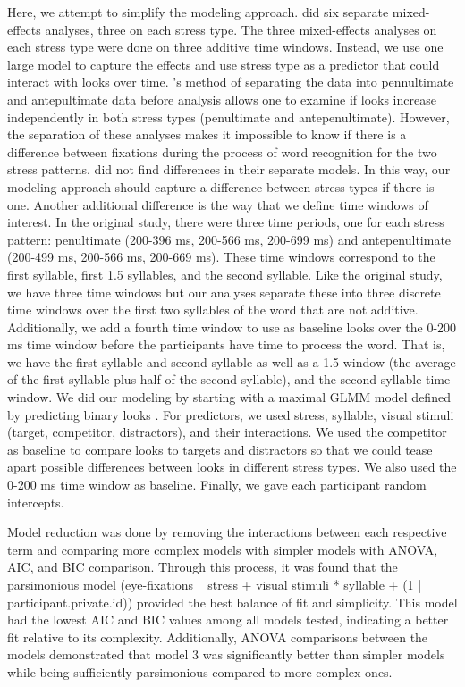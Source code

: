 Here, we attempt to simplify the modeling approach. \cite{Sulpizio_McQueen_2012} did six separate mixed-effects analyses, three on each stress type. The three mixed-effects analyses on each stress type were done on three additive time windows. Instead, we use one large model to capture the effects and use stress type as a predictor that could interact with looks over time. \cite{Sulpizio_McQueen_2012}'s method of separating the data into pennultimate and antepultimate data before analysis allows one to examine if looks increase independently in both stress types (penultimate and antepenultimate). However, the separation of these analyses makes it impossible to know if there is a difference between fixations during the process of word recognition for the two stress patterns. \cite{Sulpizio_McQueen_2012} did not find differences in their separate models. In this way, our modeling approach should capture a difference between stress types if there is one. Another additional difference is the way that we define time windows of interest. In the original study, there were three time periods, one for each stress pattern: penultimate (200-396 ms, 200-566 ms, 200-699 ms) and antepenultimate (200-499 ms, 200-566 ms, 200-669 ms). These time windows correspond to the first syllable, first 1.5 syllables, and the second syllable. Like the original study, we have three time windows but our analyses separate these into three discrete time windows over the first two syllables of the word that are not additive. Additionally, we add a fourth time window to use as baseline looks over the 0-200 ms time window before the participants have time to process the word. That is, we have the first syllable and second syllable as well as a 1.5 window (the average of the first syllable plus half of the second syllable), and the second syllable time window. We did our modeling by starting with a maximal GLMM model defined by predicting binary looks \citep{Barr_2008}. For predictors, we used stress, syllable, visual stimuli (target, competitor, distractors), and their interactions. We used the competitor as baseline to compare looks to targets and distractors so that we could tease apart possible differences between looks in different stress types. We also used the 0-200 ms time window as baseline. Finally, we gave each participant random intercepts.

Model reduction was done by removing the interactions between each respective term and comparing more complex models with simpler models with ANOVA, AIC, and BIC comparison. Through this process, it was found that the parsimonious model (eye-fixations ~ stress + visual stimuli * syllable + (1 | participant.private.id)) provided the best balance of fit and simplicity. This model had the lowest AIC and BIC values among all models tested, indicating a better fit relative to its complexity. Additionally, ANOVA comparisons between the models demonstrated that model 3 was significantly better than simpler models while being sufficiently parsimonious compared to more complex ones.

